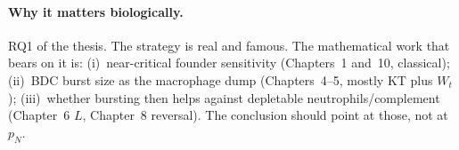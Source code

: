 \documentclass[11pt,a4paper]{report}
\begin{document}
\paragraph{Why it matters biologically.}
RQ1 of the thesis. The strategy is real and famous. The mathematical work
that bears on it is: (i)~near-critical founder sensitivity (Chapters~1
and~10, classical); (ii)~BDC burst size as the macrophage dump
(Chapters~4--5, mostly KT plus \(W_t\)); (iii)~whether bursting then
helps against depletable neutrophils/complement (Chapter~6 \(L\),
Chapter~8 reversal). The conclusion should point at those, not at
\(p_N\).
\end{document}
